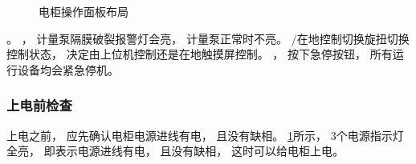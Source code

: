 \documentclass[UTF8,a4paper,12pt,titlepage]{ctexart}
\begin{document}
\begin{figure}[h]
            \caption{电柜操作面板布局}\label{fig:p5}
        \end{figure}

        。
        ，
        计量泵隔膜破裂报警灯会亮，
        计量泵正常时不亮。
        /在地控制切换旋扭切换控制状态，
        决定由上位机控制还是在地触摸屏控制。
        ，
        按下急停按钮，
        所有运行设备均会紧急停机。

      \subsubsection{上电前检查}
         上电之前，
         应先确认电柜电源进线有电，
         且没有缺相。
      \ref{fig:p5}所示，
      3个电源指示灯全亮，
      即表示电源进线有电，
      且没有缺相，
      这时可以给电柜上电。

      \newpage %
\end{document}
